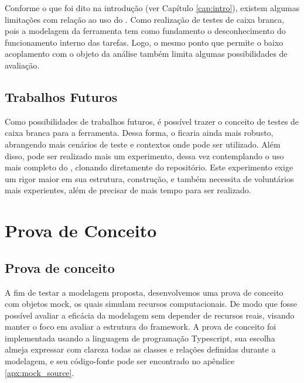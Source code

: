 \documentclass[12pt]{tcc}
\begin{document}
	Conforme o que foi dito na introdução (ver Capítulo \ref{cap:intro}), existem algumas limitações com relação ao uso do .
	Como realização de testes de caixa branca, pois a modelagem da ferramenta tem como fundamento o desconhecimento do funcionamento interno das tarefas.
	Logo, o mesmo ponto que permite o baixo acoplamento com o objeto da análise também limita algumas possibilidades de avaliação.

	\section{Trabalhos Futuros}
	\label{section:trabalhos-futuros}

	Como possibilidades de trabalhos futuros, é possível trazer o conceito de testes de caixa branca para a ferramenta. Dessa forma, o  ficaria ainda mais robusto, abrangendo mais cenários de teste e contextos onde pode ser utilizado. Além disso, pode ser realizado mais um experimento, dessa vez contemplando o uso mais completo do , clonando diretamente do repositório. Este experimento exige um rigor maior em sua estrutura, construção, e também necessita de voluntários mais experientes, além de precisar de mais tempo para ser realizado.


	\label{bibpage}
	\renewcommand\bibname{Referências}
	
	
	\label{bibfinalpage}

	\label{lastpage}



	\appendix








\chapter{Prova de Conceito}
\label{apx:mock}

\section{Prova de conceito}
\label{cap:prova_de_conceito}

A fim de testar a modelagem proposta, desenvolvemos uma prova de conceito com objetos mock, os quais simulam recursos computacionais.
De modo que fosse possível avaliar a eficácia da modelagem sem depender de recursos reais, visando manter o foco em avaliar a estrutura do framework.
A prova de conceito foi implementada usando a linguagem de programação Typescript, sua escolha almeja expressar com clareza todas as classes e relações definidas durante a modelagem, e seu código-fonte pode ser encontrado no apêndice \ref{apx:mock_source}.
\end{document}
